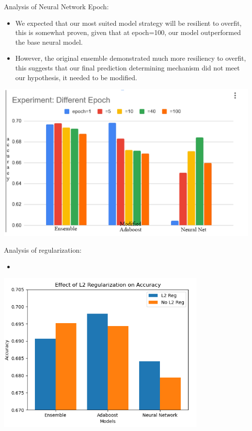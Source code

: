 \documentclass{article}
\begin{document}
    Analysis of Neural Network Epoch:
    \begin{itemize}
        \item We expected that our most suited model strategy will be resilient to overfit, this is somewhat proven, given that at epoch=100, our model outperformed the base neural model.
        \item However, the original ensemble demonstrated much more resiliency to overfit, this suggests that our final prediction determining mechanism did not meet our hypothesis, it needed to be modified.
    \end{itemize}

    \includegraphics[scale=0.6]{figures/pb_f6.png}

    Analysis of regularization:
    \begin{itemize}
        \item 
    \end{itemize}

    \includegraphics[scale=0.7]{figures/pb_f7.png}
\end{document}
